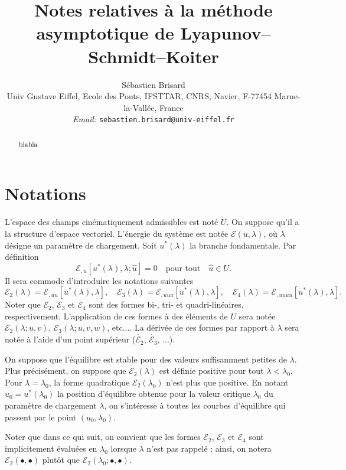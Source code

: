 \documentclass{article}
\newcommand{\tmaffiliation}[1]{\\ #1}
\newcommand{\tmemail}[1]{\\ \textit{Email:} \texttt{#1}}
\begin{document}
\title{Notes relatives à la méthode asymptotique de
Lyapunov--Schmidt--Koiter}

\author{
  Sébastien Brisard
  \tmaffiliation{Univ Gustave Eiffel, Ecole des Ponts, IFSTTAR, CNRS, Navier,
  F-77454 Marne-la-Vallée, France}
  \tmemail{sebastien.brisard@univ-eiffel.fr}
}

\maketitle

\begin{abstract}
  blabla
\end{abstract}

\section{Notations}

L'espace des champs cinématiquement admissibles est noté $U$. On
suppose qu'il a la structure d'espace vectoriel. L'énergie du système
est notée $ℰ (u, λ)$, où $λ$ désigne un
paramètre de chargement. Soit $u^{\ast} (λ)$ la branche
fondamentale. Par définition
\begin{equation}
  ℰ_{, u} [u^{\ast} (λ), λ ; \hat{u}] = 0 \quad
  \text{pour tout} \quad \hat{u}∈U.
\end{equation}
Il sera commode d'introduire les notations suivantes
\begin{equation}
  ℰ_2 (λ) =ℰ_{, u  u}  [u^{\ast} (λ),
  λ], \quad ℰ_3 (λ) =ℰ_{, u  u
   u} [u^{\ast} (λ), λ], \quad ℰ_4 (λ)
  =ℰ_{, u  u  u  u} [u^{\ast} (λ),
  λ] .
\end{equation}
Noter que $ℰ_2$, $ℰ_3$ et $ℰ_4$ sont des formes
bi-, tri- et quadri-linéaires, respectivement. L'application de ces formes
à des éléments de $U$ sera notée $ℰ_2 (λ ; u,
v)$, $ℰ_3 (λ ; u, v, w)$, etc.... La dérivée de ces
formes par rapport à $λ$ sera notée à l'aide d'un point
supérieur ($\dot{ℰ_2}$, $\dot{ℰ_3}$, ...).

On suppose que l'équilibre est stable pour des valeurs suffisamment
petites de $λ$. Plus précisément, on suppose que $ℰ_2
(λ)$ est définie positive pour tout $λ < λ_0$. Pour
$λ = λ_0$, la forme quadratique $ℰ_2 (λ_0)$ n'est
plus que positive. En notant $u_0 = u^{\ast} (λ_0)$ la position
d'équilibre obtenue pour la valeur critique $λ_0$ du paramètre
de chargement $λ$, on s'intéresse à toutes les courbes
d'équilibre qui passent par le point $(u_0, λ_0)$.

Noter que dans ce qui suit, on convient que les formes $ℰ_2$,
$ℰ_3$ et $ℰ_4$ sont implicitement évaluées en
$λ_0$ lorsque $λ$ n'est pas rappelé : ainsi, on notera
$ℰ_2 (\bullet, \bullet)$ plutôt que $ℰ_2 (λ_0 ;
\bullet, \bullet)$.
\end{document}
